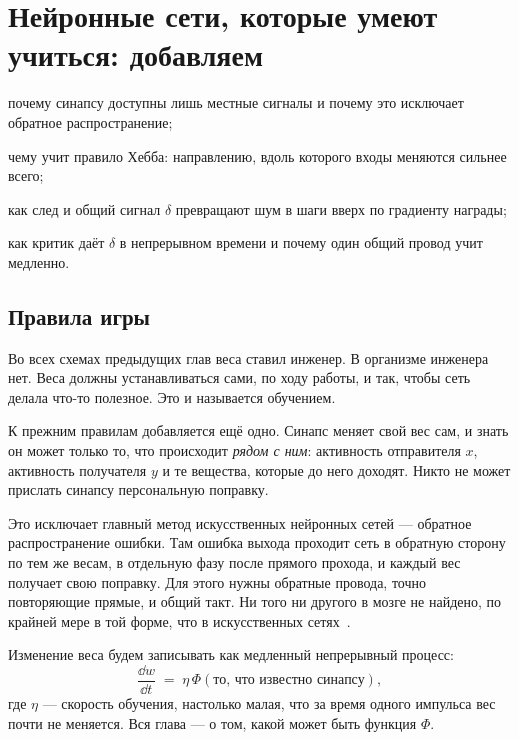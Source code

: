 \chapter{Нейронные сети, которые умеют учиться: добавляем }
\label{sec:dofa}
\begin{chaptergoals}
\item почему синапсу доступны лишь местные сигналы и почему это исключает обратное распространение;
\item чему учит правило Хебба: направлению, вдоль которого входы меняются сильнее всего;
\item как след и общий сигнал $\delta$ превращают шум в шаги вверх по градиенту награды;
\item как критик даёт $\delta$ в непрерывном времени и почему один общий провод учит медленно.
\end{chaptergoals}

\section{Правила игры}

Во всех схемах предыдущих глав веса ставил инженер. В организме инженера нет. Веса должны устанавливаться сами, по ходу работы, и так, чтобы сеть делала что-то полезное. Это и называется обучением.

К прежним правилам добавляется ещё одно. Синапс меняет свой вес сам, и знать он может только то, что происходит \emph{рядом с ним}: активность отправителя $x$, активность получателя $y$ и те вещества, которые до него доходят. Никто не может прислать синапсу персональную поправку.

Это исключает главный метод искусственных нейронных сетей --- обратное распространение ошибки. Там ошибка выхода проходит сеть в обратную сторону по тем же весам, в отдельную фазу после прямого прохода, и каждый вес получает свою поправку. Для этого нужны обратные провода, точно повторяющие прямые, и общий такт. Ни того ни другого в мозге не найдено, по крайней мере в той форме, что в искусственных сетях~\cite{Lillicrap2020,WhittingtonBogacz2019}.

Изменение веса будем записывать как медленный непрерывный процесс:
\begin{equation}
\frac{\dd w}{\dd t} \;=\; \eta\,\Phi(\text{то, что известно синапсу}),
\label{eq:plasticity}
\end{equation}
где $\eta$ --- скорость обучения, настолько малая, что за время одного импульса вес почти не меняется. Вся глава --- о том, какой может быть функция $\Phi$.

